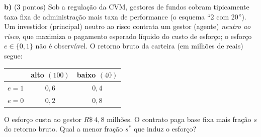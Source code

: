 \textbf{b)} (3 pontos) Sob a regulação da CVM, gestores de fundos cobram tipicamente taxa fixa de administração mais taxa de performance (o esquema ``2 com 20''). Um investidor (principal) neutro ao risco contrata um gestor (agente) \emph{neutro ao risco}, que maximiza o pagamento esperado líquido do custo de esforço; o esforço $e\in\{0,1\}$ não é observável. O retorno bruto da carteira (em milhões de reais) segue:
\begin{center}
\begin{tabular}{lcc}
 & alto $(100)$ & baixo $(40)$ \\
\hline
$e=1$ & $0{,}6$ & $0{,}4$ \\
$e=0$ & $0{,}2$ & $0{,}8$ \\
\end{tabular}
\end{center}
O esforço custa ao gestor $R\$~4{,}8$ milhões. O contrato paga base fixa mais fração $s$ do retorno bruto. Qual a menor fração $s^{*}$ que induz o esforço?

